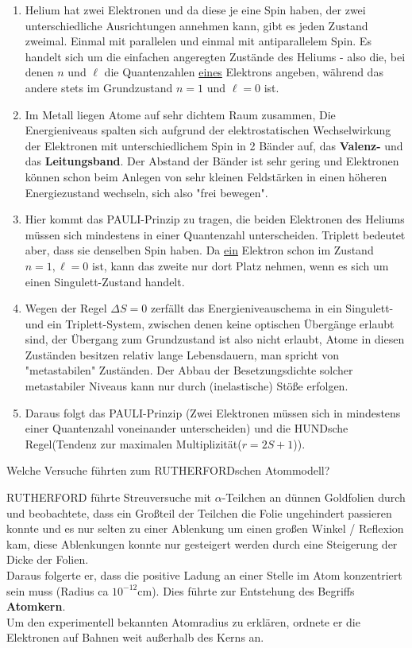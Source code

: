 \documentclass[12pt,a4paper,ngerman]{article}
\begin{document}
\begin{enumerate}
\item Helium hat zwei Elektronen und da diese je eine Spin haben, der zwei unterschiedliche Ausrichtungen annehmen kann, gibt es jeden Zustand zweimal. Einmal mit parallelen und einmal mit antiparallelem Spin. Es handelt sich um die einfachen angeregten Zustände des Heliums -  also die, bei denen $n$ und $\ell$ die Quantenzahlen \underline{eines} Elektrons angeben, während das andere stets im Grundzustand $n=1$ und $\ell=0$ ist. 
\item Im Metall liegen Atome auf sehr dichtem Raum zusammen, Die Energieniveaus spalten sich aufgrund der elektrostatischen Wechselwirkung der Elektronen mit unterschiedlichem Spin in 2 Bänder auf, das \textbf{Valenz-} und das \textbf{Leitungsband}. Der Abstand der Bänder ist sehr gering und Elektronen können schon beim Anlegen von sehr kleinen Feldstärken in einen höheren Energiezustand wechseln, sich also "frei bewegen".
\item Hier kommt das PAULI-Prinzip zu tragen, die beiden Elektronen des Heliums müssen sich mindestens in einer Quantenzahl unterscheiden. Triplett bedeutet aber, dass sie denselben Spin haben. Da \underline{ein} Elektron schon im Zustand $n=1,\ell=0$ ist, kann das zweite nur dort Platz nehmen, wenn es sich um einen Singulett-Zustand handelt. 
\item Wegen der Regel $\Delta S = 0$ zerfällt das Energieniveauschema in ein Singulett- und ein Triplett-System, zwischen denen keine optischen Übergänge erlaubt sind, der Übergang zum Grundzustand ist also nicht erlaubt, Atome in diesen Zuständen besitzen relativ lange Lebensdauern, man spricht von "metastabilen" Zuständen. Der Abbau der Besetzungsdichte solcher metastabiler Niveaus kann nur durch (inelastische) Stöße erfolgen.
\item Daraus folgt das PAULI-Prinzip (Zwei Elektronen müssen sich in mindestens einer Quantenzahl voneinander unterscheiden) und die HUNDsche Regel(Tendenz zur maximalen Multiplizität($r=2S+1$)). 
\end{enumerate}

\pagebreak
\begin{framed}
Welche Versuche führten zum RUTHERFORDschen Atommodell?
\end{framed}

RUTHERFORD führte Streuversuche mit $\alpha$-Teilchen an dünnen Goldfolien durch und beobachtete, dass ein Großteil der Teilchen die Folie ungehindert passieren konnte und es nur selten zu einer Ablenkung um einen großen Winkel / Reflexion kam, diese Ablenkungen konnte nur gesteigert werden durch eine Steigerung der Dicke der Folien. \\
Daraus folgerte er, dass die positive Ladung an einer Stelle im Atom konzentriert sein muss (Radius ca $10^{-12}$cm). Dies führte zur Entstehung des Begriffs \textbf{Atomkern}. \\
Um den experimentell bekannten Atomradius zu erklären, ordnete er die Elektronen auf Bahnen weit außerhalb des Kerns an. 
\end{document}
